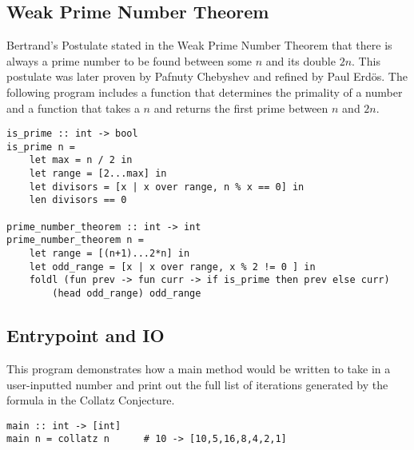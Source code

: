 ﻿\documentclass[5pt]{article}
\begin{document}
\subsection{Weak Prime Number Theorem}
Bertrand's Postulate stated in the Weak Prime Number Theorem that there is 
always a prime number to be found between some $n$ and its double $2n$. This 
postulate was later proven by Pafnuty Chebyshev and refined by Paul Erd\"{o}s. 
The following program includes a function that determines the primality of a 
number and a function that takes a $n$ and returns the first prime between 
$n$ and $2n$.
\begin{lstlisting}[language=rippl]
is_prime :: int -> bool
is_prime n =
    let max = n / 2 in
    let range = [2...max] in
    let divisors = [x | x over range, n % x == 0] in
    len divisors == 0
    
prime_number_theorem :: int -> int
prime_number_theorem n =
    let range = [(n+1)...2*n] in
    let odd_range = [x | x over range, x % 2 != 0 ] in
    foldl (fun prev -> fun curr -> if is_prime then prev else curr)
        (head odd_range) odd_range
\end{lstlisting}
\subsection{Entrypoint and IO}
This program demonstrates how a main method would be written to take in a user-inputted number and print out the full list of iterations generated by the formula in the Collatz Conjecture.
\begin{lstlisting}[language=rippl]
main :: int -> [int]
main n = collatz n      # 10 -> [10,5,16,8,4,2,1]
\end{lstlisting}
\end{document}
